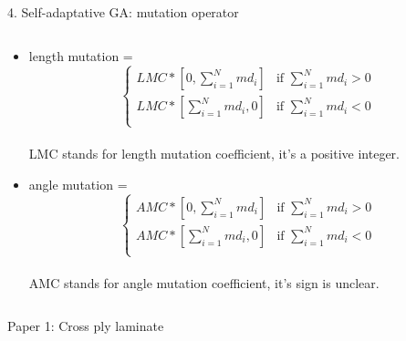\documentclass{beamer}
\begin{document}
\begin{frame}{4. Self-adaptative GA:  mutation operator}
    \begin{columns}[c]
	\begin{column}{1\textwidth}
		\begin{itemize}
			\item length mutation =  
				\[
				  \begin{cases}
					  LMC*[0, \sum_{i=1}^{N}{md_i}] & \text{if $\sum_{i=1}^{N}{md_i} > 0$} \\
					  LMC*[\sum_{i=1}^{N}{md_i}, 0] & \text{if $\sum_{i=1}^{N}{md_i} < 0$} \\
				  \end{cases}
				\] \\
				LMC stands for length mutation coefficient, it's a positive integer.
			\item angle mutation = 
				\[
				  \begin{cases}
					  AMC*[0, \sum_{i=1}^{N}{md_i}] & \text{if $\sum_{i=1}^{N}{md_i} > 0$} \\
					  AMC*[\sum_{i=1}^{N}{md_i}, 0] & \text{if $\sum_{i=1}^{N}{md_i} < 0$} \\
				  \end{cases}
				\] \\
				AMC stands for angle mutation coefficient, it's sign is unclear.
		\end{itemize}
	\end{column}
\end{columns}
\end{frame}

\begin{frame}{Paper 1: Cross ply laminate}
	
\end{frame}
\end{document}
